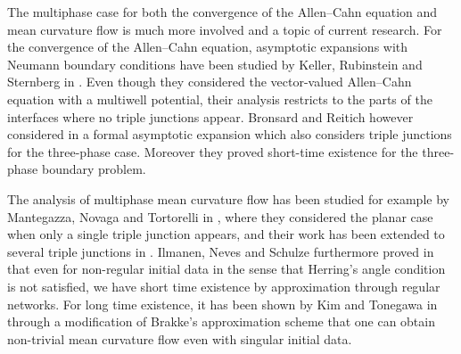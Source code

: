 The multiphase case for both the convergence of the Allen--Cahn equation and 
mean 
curvature flow is much more involved and a topic of current research. For the 
convergence of the Allen--Cahn equation, asymptotic expansions  with Neumann 
boundary conditions 
have been studied by Keller, Rubinstein and Sternberg in 
\cite{keller_rubinstein_sternberg_fast_reaction_slow_diffusion}. Even though 
they considered the vector-valued Allen--Cahn equation with a multiwell 
potential, their analysis restricts to the parts of the interfaces where no 
triple junctions appear. Bronsard and 
Reitich however considered in 
\cite{bronsard_reitich_on_three_phase_boundary_motion_and_singular_limit} a 
formal asymptotic expansion which also considers triple junctions
for the three-phase case. Moreover they proved short-time existence for the 
three-phase boundary problem.

The analysis of multiphase mean curvature flow has been studied for example by 
Mantegazza, Novaga and Tortorelli in 
\cite{mantegazza_novaga_tortorelli_motion_by_curvature_of_planar_networks}, 
where they considered the planar case when only a single triple junction 
appears, and their work has been extended to several triple junctions in 
\cite{mantegazza_novaga_pluda_schule_evolution_of_networks_with_multiple_junctions}.
Ilmanen, Neves and Schulze furthermore proved in 
\cite{ilmanen_neves_schulze_on_short_time_existence_for_the_planar_network_flow}
that even for non-regular initial data in the sense that Herring's angle 
condition is not satisfied, we have short time existence by approximation 
through regular networks. For long time existence, it has been shown by Kim and 
Tonegawa in \cite{kim_tonegawa_on_the_mean_curvature_flow_of_grain_boundaries} 
through a modification of Brakke's approximation scheme that one can obtain 
non-trivial mean curvature flow even with singular initial data.

